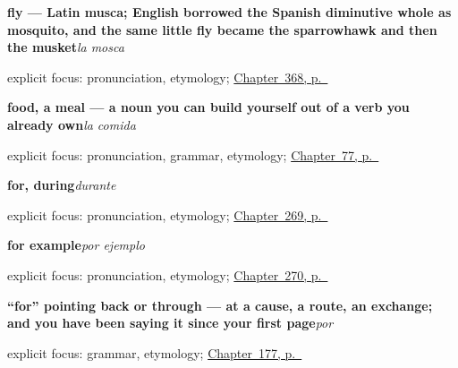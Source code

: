 \noindent\begin{minipage}[t]{\linewidth}
\raggedright
\textbf{fly — Latin musca; English borrowed the Spanish diminutive whole as mosquito, and the same little fly became the sparrowhawk and then the musket}\enspace\emph{la mosca}\par
\footnotesize explicit focus: pronunciation, etymology; \hyperref[ch:la-abeja-y-la-mosca]{Chapter~368, p.~\pageref*{ch:la-abeja-y-la-mosca}}
\end{minipage}\par\smallskip

\noindent\begin{minipage}[t]{\linewidth}
\raggedright
\textbf{food, a meal — a noun you can build yourself out of a verb you already own}\enspace\emph{la comida}\par
\footnotesize explicit focus: pronunciation, grammar, etymology; \hyperref[ch:noun-comida]{Chapter~77, p.~\pageref*{ch:noun-comida}}
\end{minipage}\par\smallskip

\noindent\begin{minipage}[t]{\linewidth}
\raggedright
\textbf{for, during}\enspace\emph{durante}\par
\footnotesize explicit focus: pronunciation, etymology; \hyperref[ch:experiencia]{Chapter~269, p.~\pageref*{ch:experiencia}}
\end{minipage}\par\smallskip

\noindent\begin{minipage}[t]{\linewidth}
\raggedright
\textbf{for example}\enspace\emph{por ejemplo}\par
\footnotesize explicit focus: pronunciation, etymology; \hyperref[ch:argumentar]{Chapter~270, p.~\pageref*{ch:argumentar}}
\end{minipage}\par\smallskip

\noindent\begin{minipage}[t]{\linewidth}
\raggedright
\textbf{\textquotedblleft{}for\textquotedblright{} pointing back or through — at a cause, a route, an exchange; and you have been saying it since your first page}\enspace\emph{por}\par
\footnotesize explicit focus: grammar, etymology; \hyperref[ch:por]{Chapter~177, p.~\pageref*{ch:por}}
\end{minipage}\par\smallskip

